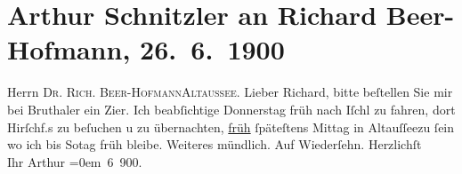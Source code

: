 

         
         \renewcommand{\erwaehntePersonen}{Personen: Richard Beer-Hofmann, Georg Hirschfeld, Elly Petersen}
         \renewcommand{\erwaehnteOrte}{Orte: Altaussee, Bad Ischl, Gasthaus Brunnthaler, IX., Alsergrund, Wien}
         \renewcommand{\erwaehnteWerke}{}
               \section[Arthur Schnitzler an Richard Beer-Hofmann, 26. 6. 1900]{ Arthur Schnitzler an Richard Beer-Hofmann, 26. 6. 1900}\nopagebreak{}\rehead{ }\begin{ledgroupsized}[t]{13cm}\normalsize\beginnumbering \toendnotes[C]{\smallbreak\pagebreak[2]} 
\pstart{}{\pb}Herrn \textsc{Dr. Rich.
                     Beer-Hofmann}\pend{}\pstart{}\textsc{Altaussee.}\pend{}{\bigskip}\pstart
           \noindent{}{\pb}Lieber Richard, bitte beſtellen Sie mir
               bei Bru{\geminationn}thaler ein
                  Zi{\geminationm}er. Ich beabſichtige Donnerstag früh
               nach Iſchl zu fahren, dort Hirſchf.s zu beſuchen u zu übernachten, \uline{früh} ſpäteſtens Mittag in Altauſſeezu ſein wo ich bis So{\geminationn}tag früh bleibe. Weiteres mündlich.\pend
           \pstart
           Auf Wiederſehn. Herzlichſt{\\[\baselineskip]}Ihr \spacefill\mbox{Arthur}\pend
           \leftskip=0em{} 6 900.\pend
           
         
         \endnumbering{}\end{ledgroupsized}  \newcommand{\dateiname}{L01050}\newcommand{\titel}{Arthur Schnitzler an Richard Beer-Hofmann, 26. 6. 1900}\newcommand{\editorInnen}{Martin Anton Müller und Gerd-Hermann Susen}
      